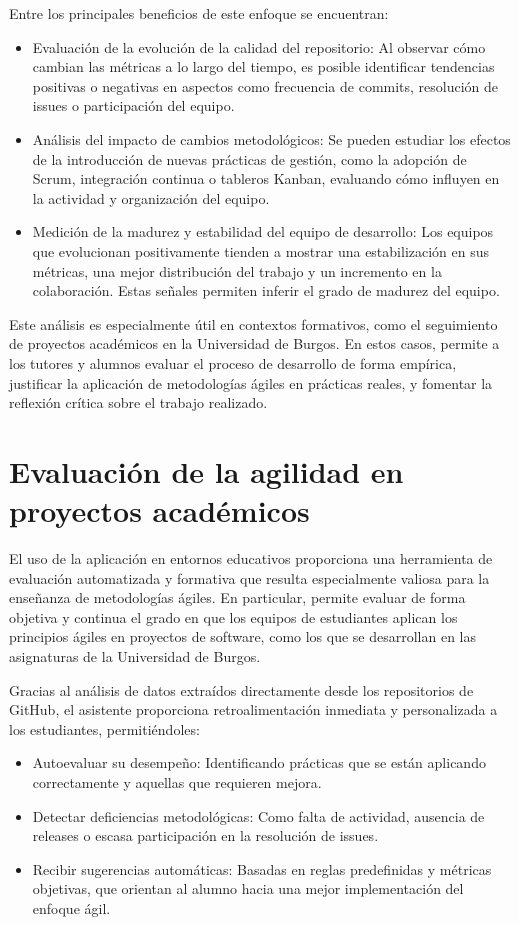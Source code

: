 Entre los principales beneficios de este enfoque se encuentran:

\begin{itemize}
\item Evaluación de la evolución de la calidad del repositorio: Al observar cómo cambian las métricas a lo largo del tiempo, es posible identificar tendencias positivas o negativas en aspectos como frecuencia de commits, resolución de issues o participación del equipo.
\item Análisis del impacto de cambios metodológicos: Se pueden estudiar los efectos de la introducción de nuevas prácticas de gestión, como la adopción de Scrum, integración continua o tableros Kanban, evaluando cómo influyen en la actividad y organización del equipo.
\item Medición de la madurez y estabilidad del equipo de desarrollo: Los equipos que evolucionan positivamente tienden a mostrar una estabilización en sus métricas, una mejor distribución del trabajo y un incremento en la colaboración. Estas señales permiten inferir el grado de madurez del equipo.
\end{itemize}

Este análisis es especialmente útil en contextos formativos, como el seguimiento de proyectos académicos en la Universidad de Burgos. En estos casos, permite a los tutores y alumnos evaluar el proceso de desarrollo de forma empírica, justificar la aplicación de metodologías ágiles en prácticas reales, y fomentar la reflexión crítica sobre el trabajo realizado.

\section{Evaluación de la agilidad en proyectos académicos}
El uso de la aplicación en entornos educativos proporciona una herramienta de evaluación automatizada y formativa que resulta especialmente valiosa para la enseñanza de metodologías ágiles. En particular, permite evaluar de forma objetiva y continua el grado en que los equipos de estudiantes aplican los principios ágiles en proyectos de software, como los que se desarrollan en las asignaturas de la Universidad de Burgos.

Gracias al análisis de datos extraídos directamente desde los repositorios de GitHub, el asistente proporciona retroalimentación inmediata y personalizada a los estudiantes, permitiéndoles:

\begin{itemize}
\item Autoevaluar su desempeño: Identificando prácticas que se están aplicando correctamente y aquellas que requieren mejora.
\item Detectar deficiencias metodológicas: Como falta de actividad, ausencia de releases o escasa participación en la resolución de issues.
\item Recibir sugerencias automáticas: Basadas en reglas predefinidas y métricas objetivas, que orientan al alumno hacia una mejor implementación del enfoque ágil.
\end{itemize}

